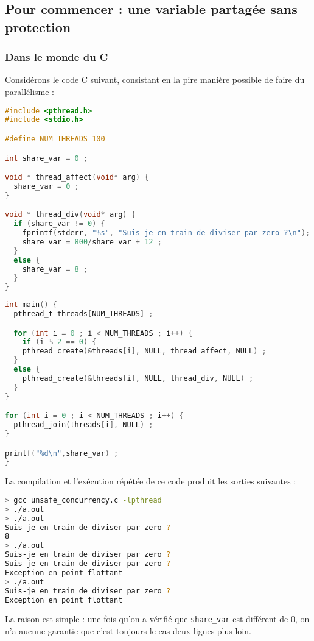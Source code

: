 \subsection{Pour commencer : une variable partagée sans protection}
\begin{frame}[fragile]
  \frametitle{Dans le monde du C}
  Considérons le code C suivant, consistant en la pire manière possible de faire du parallélisme :
  \begin{lstlisting}[language=C, basicstyle=\tiny{}]
#include <pthread.h>
#include <stdio.h>

#define NUM_THREADS 100

int share_var = 0 ;

void * thread_affect(void* arg) {
  share_var = 0 ;
}

void * thread_div(void* arg) {
  if (share_var != 0) {
    fprintf(stderr, "%s", "Suis-je en train de diviser par zero ?\n"); 
    share_var = 800/share_var + 12 ;
  }
  else {
    share_var = 8 ;
  }
}
  \end{lstlisting}
\end{frame}
\begin{frame}[fragile]
  \begin{lstlisting}[language=C, basicstyle=\tiny{}]
int main() {
  pthread_t threads[NUM_THREADS] ;

  for (int i = 0 ; i < NUM_THREADS ; i++) {
    if (i % 2 == 0) {
    pthread_create(&threads[i], NULL, thread_affect, NULL) ;
  }
  else {
    pthread_create(&threads[i], NULL, thread_div, NULL) ;
  }
}

for (int i = 0 ; i < NUM_THREADS ; i++) {
  pthread_join(threads[i], NULL) ;
}

printf("%d\n",share_var) ;
}
\end{lstlisting}  
\end{frame}
\begin{frame}[fragile]
  La compilation et l'exécution répétée de ce code produit les sorties suivantes :
  \begin{lstlisting}[language=bash, basicstyle=\tiny{}]
> gcc unsafe_concurrency.c -lpthread
> ./a.out
> ./a.out
Suis-je en train de diviser par zero ?
8
> ./a.out
Suis-je en train de diviser par zero ?
Suis-je en train de diviser par zero ?
Exception en point flottant
> ./a.out
Suis-je en train de diviser par zero ?
Exception en point flottant
  \end{lstlisting}
  La raison est simple : une fois qu'on a vérifié que \texttt{share\_var} est différent de 0, on n'a aucune garantie que c'est toujours le cas deux lignes plus loin.
\end{frame}

